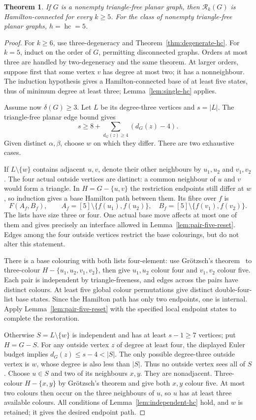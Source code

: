 \documentclass[11pt]{article}
\newtheorem{theorem}{Theorem}[section]
\theoremstyle{remark}
\newcommand{\Rk}{\mathcal R_k}
\newcommand{\hc}{\operatorname{hc}}
\numberwithin{equation}{section}
\numberwithin{table}{section}
\begin{document}
\begin{theorem}
\label{thm:trianglefree-hc}
If $G$ is a nonempty triangle-free planar graph, then $\Rk(G)$ is
Hamilton-connected for every $k\ge5$.  For the class of nonempty
triangle-free planar graphs,
$h=\hc=5$.
\end{theorem}

\begin{proof}
For $k\ge6$, use three-degeneracy and
Theorem~\ref{thm:degenerate-hc}.  For $k=5$, induct on the order of
$G$, permitting disconnected graphs.  Orders at most three are handled
by two-degeneracy and the same theorem.  At larger orders, suppose
first that some vertex $v$ has degree at most two; it has a nonneighbour.  The induction hypothesis
gives a Hamilton-connected base of at least five states, thus of minimum
degree at least three; Lemma~\ref{lem:single-hc} applies.

Assume now $\delta(G)\ge3$.  Let $L$ be its degree-three vertices
and $s=|L|$.  The triangle-free planar edge bound gives
\[
 s\ge8+\sum_{d_G(z)\ge4}(d_G(z)-4).
\]
Given distinct $\alpha,\beta$, choose $w$ on which they differ.
There are two exhaustive cases.

If $L\setminus\{w\}$ contains adjacent $u,v$, denote their other
neighbours by $u_1,u_2$ and $v_1,v_2$.  The four actual outside
vertices are distinct: a common neighbour of $u$ and $v$ would form
a triangle.  In $H=G-\{u,v\}$ the restriction endpoints still differ
at $w$, so induction gives a base Hamilton path between them.  Its
fibre over $f$ is
\[
 F(A_f,B_f),\qquad
 A_f=[5]\setminus\{f(u_1),f(u_2)\},\quad
 B_f=[5]\setminus\{f(v_1),f(v_2)\}.
\]
The lists have size three or four.  One actual base move affects at
most one of them and gives precisely an interface allowed in
Lemma~\ref{lem:pair-five-reset}.  Edges among the four outside
vertices restrict the base colourings, but do not alter this statement.

There is a base colouring with both lists four-element: use
Gr\"otzsch's theorem~\cite{Grotzsch59} to three-colour
$H-\{u_1,u_2,v_1,v_2\}$, then give $u_1,u_2$ colour four and
$v_1,v_2$ colour five.  Each pair is independent by triangle-freeness,
and edges across the pairs have distinct colours.  At least five global
colour permutations give distinct double-four-list base states.  Since
the Hamilton path has only two endpoints, one is internal.  Apply
Lemma~\ref{lem:pair-five-reset} with the specified local endpoint
states to complete the restoration.

Otherwise $S=L\setminus\{w\}$ is independent and has at least
$s-1\ge7$ vertices; put $H=G-S$.  For any outside vertex $z$ of degree at least
four, the displayed Euler budget implies $d_G(z)\le s-4<|S|$.
The only possible degree-three outside vertex is $w$, whose degree is
also less than $|S|$.  Thus no outside vertex sees all of $S$.
Choose $u\in S$ and two of its neighbours $x,y$.  They are
nonadjacent.  Three-colour $H-\{x,y\}$ by Gr\"otzsch's theorem
and give both $x,y$ colour five.  At most two colours then occur on the
three neighbours of $u$, so $u$ has at least three available colours.
All conditions of Lemma~\ref{lem:independent-hc} hold, and $w$ is
retained; it gives the desired endpoint path.


\end{proof}
\end{document}
